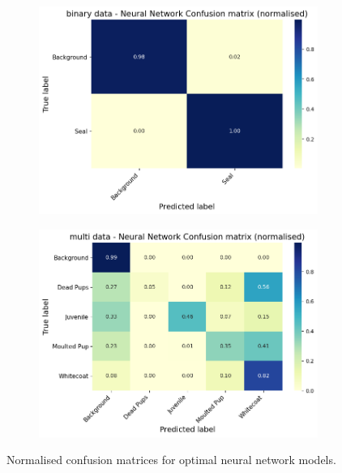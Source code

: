 \documentclass[letterpaper,12pt]{article}
\begin{document}
\begin{figure}[h]
\centering
\begin{subfigure}{.5\textwidth}
  \centering
  \includegraphics[width=\textwidth]{report/figures/binary_mlp_class_distribution_normalised.png}
  \label{fig:binary_mlp_class_distribution_normalised}
\end{subfigure}%
\begin{subfigure}{.5\textwidth}
  \centering
  \includegraphics[width=\textwidth]{report/figures/multi_mlp_class_distribution_normalised.png}
  \label{fig:multi_mlp_class_distribution_normalised}
\end{subfigure}
\caption{\label{fig:mlp_class_distribution_normalised}Normalised confusion matrices for optimal neural network models.}
\end{figure}
\end{document}
